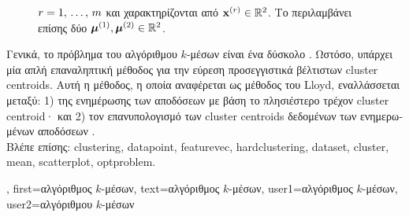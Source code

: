 {{\begin{figure}[H]
{{{			$r=1,\,\ldots,\,m$ και χαρακτηρίζονται από}  ${\bf x}^{(r)} \in \mathbb{R}^{2}$. 
			\foreignlanguage{greek}{Το}  \foreignlanguage{greek}{περιλαμβάνει επίσης δύο}  
			${\bm \mu}^{(1)}, {\bm \mu}^{(2)} \in \mathbb{R}^{2}$. \label{fig_kmeans_dict}} }
		\end{figure} 
		\foreignlanguage{greek}{Γενικά, το πρόβλημα του αλγόριθμου $k$-μέσων είναι ένα δύσκολο}  
		\cite{Mahajan2009Springer}. \foreignlanguage{greek}{Ωστόσο, υπάρχει μία απλή επαναληπτική μέθοδος για την εύρεση 
		προσεγγιστικά βέλτιστων} cluster centroids. \foreignlanguage{greek}{Αυτή η μέθοδος, η οποία αναφέρεται ως μέθοδος του}
		Lloyd, \foreignlanguage{greek}{εναλλάσσεται μεταξύ: 1) της ενημέρωσης των αποδόσεων}   
		\foreignlanguage{greek}{με βάση το πλησιέστερο τρέχον} cluster centroid· \foreignlanguage{greek}{και 2) τον 
		επανυπολογισμό των} cluster centroids \foreignlanguage{greek}{δεδομένων των ενημερωμένων αποδόσεων}
		 \cite{Lloyd1982}. \\
		\foreignlanguage{greek}{Βλέπε επίσης:} \gls{clustering}, \gls{datapoint}, \gls{featurevec}, \gls{hardclustering}, \gls{dataset}, \gls{cluster}, 
		\gls{mean}, \gls{scatterplot}, \gls{optproblem}.},
	first={\foreignlanguage{greek}{αλγόριθμος $k$-μέσων}},
	text={\foreignlanguage{greek}{αλγόριθμος $k$-μέσων}},
	user1={\foreignlanguage{greek}{αλγόριθμος $k$-μέσων}}, %
	user2={\foreignlanguage{greek}{αλγόριθμου $k$-μέσων}} %
}

